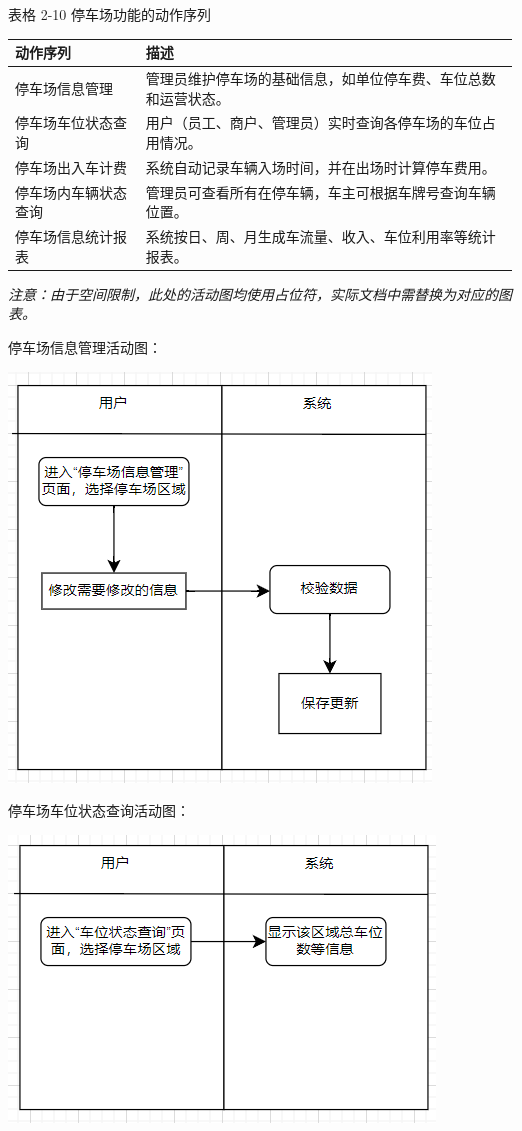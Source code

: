 \documentclass[]{article}
\let\oldincludegraphics\includegraphics
\renewcommand{\includegraphics}[2][]{%
  \begin{center}\oldincludegraphics[#1]{#2}\end{center}%
}
\begin{document}
表格 2-10 停车场功能的动作序列
\begin{longtable}[]{@{}ll@{}}
\toprule
动作序列 & 描述\tabularnewline
\midrule
\endhead
停车场信息管理 & 管理员维护停车场的基础信息，如单位停车费、车位总数和运营状态。\tabularnewline
停车场车位状态查询 & 用户（员工、商户、管理员）实时查询各停车场的车位占用情况。\tabularnewline
停车场出入车计费 & 系统自动记录车辆入场时间，并在出场时计算停车费用。\tabularnewline
停车场内车辆状态查询 & 管理员可查看所有在停车辆，车主可根据车牌号查询车辆位置。\tabularnewline
停车场信息统计报表 & 系统按日、周、月生成车流量、收入、车位利用率等统计报表。\tabularnewline
\bottomrule
\end{longtable}

\textit{注意：由于空间限制，此处的活动图均使用占位符，实际文档中需替换为对应的图表。}

停车场信息管理活动图：
\includegraphics{media/2.8/image33.png}

停车场车位状态查询活动图：
\includegraphics{media/2.8/image34.png}
\end{document}
